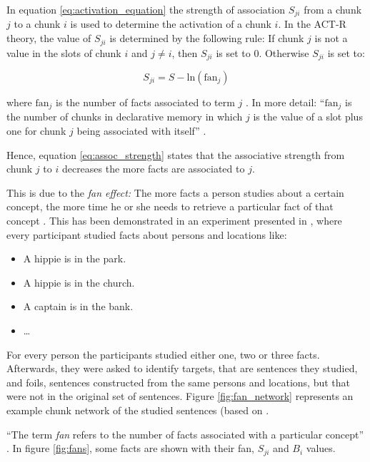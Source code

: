 In equation \eqref{eq:activation_equation} the strength of association $S_{ji}$ from a chunk $j$ to a chunk $i$ is used to determine the activation of a chunk $i$.  In the ACT-R theory, the value of $S_{ji}$ is determined by the following rule: If chunk $j$ is not a value in the slots of chunk $i$ and $j \neq i$, then $S_{ji}$ is set to 0. Otherwise $S_{ji}$ is set to: 

\begin{equation}
\label{eq:assoc_strength}
S_{ji} = S - \mathrm{ln}(\mathrm{fan}_j)
\end{equation}

where $\mathrm{fan}_j$ is the number of facts associated to term $j$ \cite[p. 1042]{anderson_implications_2000}. In more detail: ``$\mathrm{fan}_j$ is the number of chunks in declarative memory in which $j$ is the value of a slot plus one for chunk $j$ being associated with itself'' \cite[unit 5, p. 2]{actr_tutorial}.  

Hence, equation \eqref{eq:assoc_strength} states that the associative strength from chunk $j$ to $i$ decreases the more facts are associated to $j$.

This is due to the \emph{fan effect:} The more facts a person studies about a certain concept, the more time he or she needs to retrieve a particular fact of that concept \cite[p. 186]{anderson_fan_1999}. This has been demonstrated in an experiment presented in \cite{anderson_fan_1999}, where every participant studied facts about persons and locations like:

\begin{itemize}
 \item A hippie is in the park.
 \item A hippie is in the church.
 \item A captain is in the bank.
 \item \dots
\end{itemize}

For every person the participants studied either one, two or three facts. Afterwards, they were asked to identify targets, that are sentences they studied, and foils, sentences constructed from the same persons and locations, but that were not in the original set of sentences. Figure \ref{fig:fan_network} represents an example chunk network of the studied sentences (based on \cite[fig. 1]{anderson_fan_1999}.

``The term \emph{fan} refers to the number of facts associated with a particular concept'' \cite[p. 186]{anderson_fan_1999}. In figure \ref{fig:fans}, some facts are shown with their fan, $S_{ji}$ and $B_i$ values.

